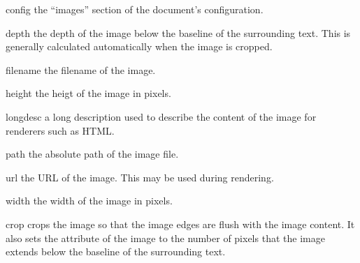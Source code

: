 \begin{memberdesc}[Image]{config}
the ``images'' section of the document's configuration.
\end{memberdesc}

\begin{memberdesc}[Image]{depth}
the depth of the image below the baseline of the
surrounding text.  This is generally calculated automatically when
the image is cropped.
\end{memberdesc}

\begin{memberdesc}[Image]{filename}
the filename of the image.
\end{memberdesc}

\begin{memberdesc}[Image]{height}
the heigt of the image in pixels.
\end{memberdesc}

\begin{memberdesc}[Image]{longdesc}
a long description used to describe the content of
the image for renderers such as HTML.
\end{memberdesc}

\begin{memberdesc}[Image]{path}
the absolute path of the image file.
\end{memberdesc}

\begin{memberdesc}[Image]{url}
the URL of the image.  This may be used during rendering.
\end{memberdesc}

\begin{memberdesc}[Image]{width}
the width of the image in pixels.
\end{memberdesc}


\begin{methoddesc}[Image]{crop}{}
crops the image so that the image edges are flush with the image
content.  It also sets the  attribute of the image
to the number of pixels that the image extends below the baseline
of the surrounding text.
\end{methoddesc}

